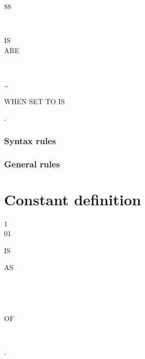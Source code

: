 \begin{syntax}
  88 \identifier
  \begin{1=}
     \\
  \end{1=}
  \begin{0-1}
    IS \\
    ARE
  \end{0-1}
  \begin{1=}
    \literal
    \begin{0-1}
      \begin{1=}
         \\
      \end{1=}
      \literal
    \end{0-1}
  \end{1=} \ldots

  \begin{0-1}
    WHEN SET TO  IS \literal
  \end{0-1}.
\end{syntax}

\subsubsection{Syntax rules}

\subsubsection{General rules}

\section{Constant definition}

\begin{syntax}
  \begin{1=}
    1 \\
    01
  \end{1=}
  \identifier {}
  \begin{0-1}
    IS 
  \end{0-1}
  \begin{1=}
    AS
    \begin{1=}
      \literal \\
      \begin{1=}
         \\
      \end{1=}
      OF \identifier
    \end{1=} \\
  \end{1=}.
\end{syntax}

